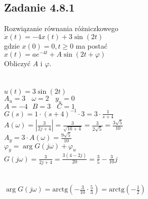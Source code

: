 \pagebreak
\subsection*{Zadanie 4.8.1} {\color{darkgray}
	Rozwiązanie równania różniczkowego\\
	$\dot{x}(t)=-4x(t)+3\sin(2t)$\\
	gdzie $x(0)=0, t \geqslant 0$ ma postać\\
	$x(t)=ae^{-4t}+A\sin(2t+\varphi)$\\
	Obliczyć $A$ i $\varphi$.\\
}\lineh
\\\\
$u(t)=3\sin(2t)$\\
$A_u=3 \ \ \ \ \omega = 2 \ \ \ \ y_u=0$\\
$A=-4 \ \ \ B=3 \ \ \ \ C=1$\\
$G(s)=1\cdot(s+4)^{-1} \cdot 3=3 \cdot \frac{1}{s+4}$\\
$A(\omega)=|\frac{3}{2j+4}|=\frac{3}{\sqrt{16+4}}=\frac{3}{2\sqrt{5}}=\frac{3\sqrt{5}}{10}$\\
$A_y=3\cdot A(\omega)=\frac{9\sqrt{5}}{10}$\\
$\varphi_y=\arg G(j\omega)+\varphi_u$\\
$G(j\omega)=\frac{3}{2j+4}=\frac{3(4-2j)}{20}=\frac 3 5 -\frac{3}{10}j$\\
\\\\
$\arg G(j\omega)=\text{arctg}(-\frac{3}{10} \cdot \frac{5}{3})=\boxed{\text{arctg}(-\frac{1}{2})}$\\


